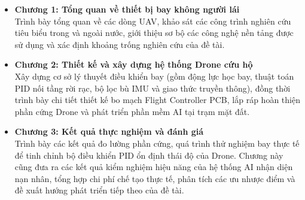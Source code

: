 \begin{itemize}
    \item \textbf{Chương 1: Tổng quan về thiết bị bay không người lái}\\
    Trình bày tổng quan về các dòng UAV, khảo sát các công trình nghiên cứu tiêu biểu trong và ngoài nước, giới thiệu sơ bộ các công nghệ nền tảng được sử dụng và xác định khoảng trống nghiên cứu của đề tài.

    \item \textbf{Chương 2: Thiết kế và xây dựng hệ thống Drone cứu hộ}\\
    Xây dựng cơ sở lý thuyết điều khiển bay (gồm động lực học bay, thuật toán PID nối tầng rời rạc, bộ lọc bù IMU và giao thức truyền thông), đồng thời trình bày chi tiết thiết kế bo mạch Flight Controller PCB, lắp ráp hoàn thiện phần cứng Drone và phát triển phần mềm AI tại trạm mặt đất.

    \item \textbf{Chương 3: Kết quả thực nghiệm và đánh giá}\\
    Trình bày các kết quả đo lường phần cứng, quá trình thử nghiệm bay thực tế để tinh chỉnh bộ điều khiển PID ổn định thái độ của Drone. Chương này cũng đưa ra các kết quả kiểm nghiệm hiệu năng của hệ thống AI nhận diện nạn nhân, tổng hợp chi phí chế tạo thực tế, phân tích các ưu nhược điểm và đề xuất hướng phát triển tiếp theo của đề tài.
\end{itemize}
